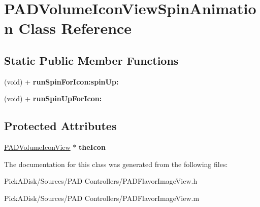 \hypertarget{interface_p_a_d_volume_icon_view_spin_animation}{
\section{PADVolumeIconViewSpinAnimation Class Reference}
\label{interface_p_a_d_volume_icon_view_spin_animation}
}
\subsection*{Static Public Member Functions}
\begin{DoxyCompactItemize}
\item 
\hypertarget{interface_p_a_d_volume_icon_view_spin_animation_aef7ac903263f5904b6af9f8dce48e69c}{
(void) + {\bfseries runSpinForIcon:spinUp:}}
\label{interface_p_a_d_volume_icon_view_spin_animation_aef7ac903263f5904b6af9f8dce48e69c}

\item 
\hypertarget{interface_p_a_d_volume_icon_view_spin_animation_a25398c33085764292b286e1d51c18c7e}{
(void) + {\bfseries runSpinUpForIcon:}}
\label{interface_p_a_d_volume_icon_view_spin_animation_a25398c33085764292b286e1d51c18c7e}

\end{DoxyCompactItemize}
\subsection*{Protected Attributes}
\begin{DoxyCompactItemize}
\item 
\hypertarget{interface_p_a_d_volume_icon_view_spin_animation_a33c3c5c4ba59cd2dec688bd361474f1d}{
\hyperlink{interface_p_a_d_volume_icon_view}{PADVolumeIconView} $\ast$ {\bfseries theIcon}}
\label{interface_p_a_d_volume_icon_view_spin_animation_a33c3c5c4ba59cd2dec688bd361474f1d}

\end{DoxyCompactItemize}


The documentation for this class was generated from the following files:\begin{DoxyCompactItemize}
\item 
PickADisk/Sources/PAD Controllers/PADFlavorImageView.h\item 
PickADisk/Sources/PAD Controllers/PADFlavorImageView.m\end{DoxyCompactItemize}
